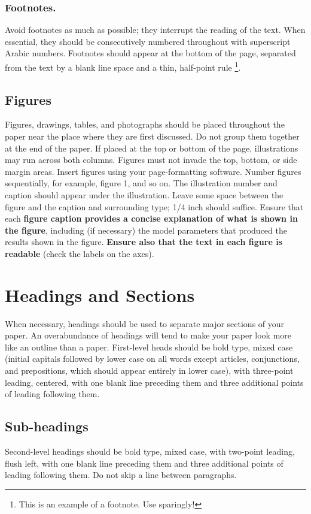 \documentclass[letterpaper]{article}
\begin{document}
\subsubsection{Footnotes.} Avoid footnotes as much as possible; they interrupt the 
reading of the text. When essential, they should be consecutively numbered 
throughout with superscript Arabic numbers. Footnotes should appear at the 
bottom of the page, separated from the text by a blank line space and a thin, 
half-point rule \footnote{This is an example of a footnote. Use sparingly!}. 

\subsection{Figures}
Figures, drawings, tables, and photographs should be placed throughout the 
paper near the place where they are first discussed. Do not group them 
together at the end of the paper. If placed at the top or bottom of the page, 
illustrations may run across both columns. Figures must not invade the top, 
bottom, or side margin areas. Insert figures using your page-formatting software. 
Number figures sequentially, for example, figure 1, and so on.
The illustration number and caption should appear under the illustration. 
Leave some space between the figure and the caption and surrounding type; 
1/4 inch should suffice. Ensure that each {\bf figure caption provides a concise 
explanation of what is shown in the figure}, including (if necessary) the model 
parameters that produced the results shown in the figure.  
{\bf Ensure also that the text in each figure is readable} (check the labels on the 
axes).

\section{Headings and Sections}

When necessary, headings should be used to separate major sections of your paper. 
An overabundance of headings will tend to make your paper look more like an 
outline than a paper.
First-level heads should be bold type, mixed case (initial capitals followed 
by lower case on all words except articles, conjunctions, and prepositions, 
which should appear entirely in lower case), with three-point leading, 
centered, with one blank line preceding them and three additional points 
of leading following them. 

\subsection{Sub-headings}
Second-level headings should be bold type, mixed case, with two-point 
leading, flush left, with one blank line preceding them and three 
additional points of leading following them. Do not skip a line between 
paragraphs.
\end{document}
